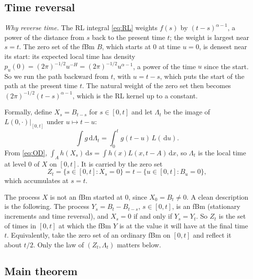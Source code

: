 \documentclass[11pt]{article}
\theoremstyle{remark}
\theoremstyle{definition}
\newcommand{\dd}{\,\mathrm{d}}
\begin{document}
\subsection{Time reversal}\label{sec:timerev}
\emph{Why reverse time.} The RL integral \eqref{eq:RL} weights $f(s)$ by $(t-s)^{\alpha-1}$, a power of the distance from $s$ back to the present time $t$; the weight is largest near $s=t$. The zero set of the fBm $B$, which starts at $0$ at time $u=0$, is densest near its start: its expected local time has density $p_u(0)=(2\pi)^{-1/2}u^{-H}=(2\pi)^{-1/2}u^{\alpha-1}$, a power of the time $u$ since the start. So we run the path backward from $t$, with $u=t-s$, which puts the start of the path at the present time $t$. The natural weight of the zero set then becomes $(2\pi)^{-1/2}(t-s)^{\alpha-1}$, which is the RL kernel up to a constant.

Formally, define $X_s=B_{t-s}$ for $s\in[0,t]$ and let $\Lambda_t$ be the image of $L(0,\cdot)|_{[0,t]}$ under $u\mapsto t-u$:
\begin{equation}\label{eq:Lambda}
\int g\dd\Lambda_t=\int_0^t g(t-u)\,L(\dd u).
\end{equation}
From \eqref{eq:OD}, $\int_A h(X_s)\dd s=\int h(x)L(x,t-A)\dd x$, so $\Lambda_t$ is the local time at level $0$ of $X$ on $[0,t]$. It is carried by the zero set
\[
Z_t=\{s\in[0,t]:X_s=0\}=t-\{u\in[0,t]:B_u=0\},
\]
which accumulates at $s=t$.

The process $X$ is not an fBm started at $0$, since $X_0=B_t\neq0$. A clean description is the following. The process $Y_s=B_t-B_{t-s}$, $s\in[0,t]$, is an fBm (stationary increments and time reversal), and $X_s=0$ if and only if $Y_s=Y_t$. So $Z_t$ is the set of times in $[0,t]$ at which the fBm $Y$ is at the value it will have at the final time $t$. Equivalently, take the zero set of an ordinary fBm on $[0,t]$ and reflect it about $t/2$. Only the law of $(Z_t,\Lambda_t)$ matters below.

\subsection{Main theorem}
\end{document}
